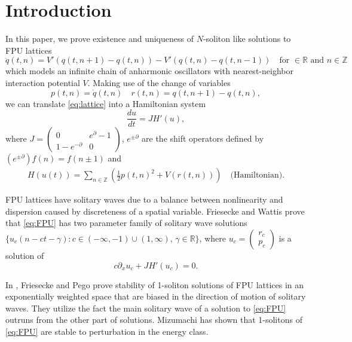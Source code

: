 \documentclass[11pt]{amsart}
\theoremstyle{remark}
\numberwithin{equation}{section}
\begin{document}
\section{Introduction}
\label{sec:intro}
In this paper, we prove existence and uniqueness of $N$-soliton like
solutions to FPU lattices
\begin{equation}
  \label{eq:lattice}
\ddot{q}(t,n)=V'(q(t,n+1)-q(t,n))-V'(q(t,n)-q(t,n-1))
\quad\text{for $\in{\mathbb{R}}$ and $n\in{\mathbb{Z}}$}  
\end{equation}
which models an infinite chain of anharmonic oscillators with
nearest-neighbor interaction potential $V$.
Making use of the change of variables
$$p(t,n)=\dot{q}(t,n)\quad r(t,n)=q(t,n+1)-q(t,n),$$
we can translate \eqref{eq:lattice} into a Hamiltonian system
\begin{equation}
  \label{eq:FPU}
  \frac{du}{dt}=JH'(u),
\end{equation}
where $J=\begin{pmatrix} 0 & e^{\partial}-1 \\ 1-e^{-{\partial}} & 0
\end{pmatrix}$, $e^{\pm{\partial}}$ are the shift operators defined
by $(e^{\pm{\partial}})f(n)=f(n\pm1)$ and
\begin{gather*}
H(u(t))=\sum_{n\in{\mathbb{Z}}}\left(\frac12p(t,n)^2+V(r(t,n))\right)
\quad\text{(Hamiltonian).}
\end{gather*}
\par
FPU lattices have solitary waves due to a balance between nonlinearity and
dispersion caused by discreteness of a spatial variable.
Friesecke and Wattis \cite{FW} prove that \eqref{eq:FPU}
has two parameter family of solitary wave solutions
$\{u_c(n-ct-\gamma) : c\in(-\infty,-1)\cup(1,\infty),\,\gamma\in{\mathbb{R}}\}$,
where $u_c=\begin{pmatrix}  r_c\\ p_c\end{pmatrix}$ is a solution of
\begin{equation}
  \label{eq:boundst}
c{\partial}_xu_c+JH'(u_c)=0.
\end{equation}
\par
In \cite{FP2,FP3,FP4}, Friesecke and Pego prove stability of 1-soliton
solutions of FPU lattices in an exponentially weighted space 
that are biased in the direction of motion of solitary waves. 
They utilize the fact the main solitary wave of a solution to \eqref{eq:FPU}
outruns from the other part of solutions.  Mizumachi \cite{Mi1} has shown that
1-solitons of \eqref{eq:FPU} are stable to perturbation in the energy class.
\end{document}
